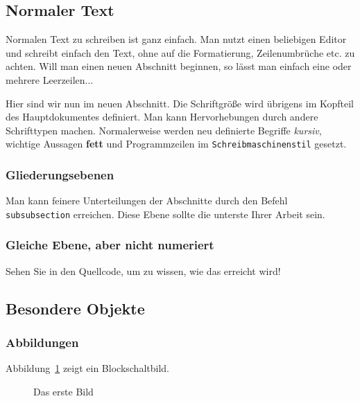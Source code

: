 \subsection{Normaler Text}

Normalen Text zu schreiben ist ganz einfach. Man nutzt einen
beliebigen Editor und schreibt einfach den Text, ohne auf die
Formatierung, Zeilenumbrüche etc. zu achten. Will man einen neuen
Abschnitt beginnen, so lässt man einfach eine oder mehrere
Leerzeilen...

Hier sind wir nun im neuen Abschnitt. Die Schriftgröße wird
übrigens im Kopfteil des Hauptdokumentes definiert. Man kann
Hervorhebungen durch andere Schrifttypen machen. Normalerweise
werden neu definierte Begriffe \textit{kursiv}, wichtige
Aussagen \textbf{fett} und Programmzeilen im \texttt{Schreibmaschinenstil}
gesetzt.

\subsubsection{Gliederungsebenen}

Man kann feinere Unterteilungen der Abschnitte durch den Befehl
\texttt{subsubsection} erreichen. Diese Ebene sollte die unterste Ihrer
Arbeit sein.

\subsubsection*{Gleiche Ebene, aber nicht numeriert}

Sehen Sie in den Quellcode, um zu wissen, wie das erreicht wird!

\subsection{Besondere Objekte}


\subsubsection{Abbildungen}\label{b:picturesubsection}

Abbildung~\ref{f:picfirstfigure} zeigt ein Blockschaltbild.

\begin{figure}[ht]		%
  \centering
  \caption{Das erste Bild}
  \label{f:picfirstfigure}
\end{figure}
 
